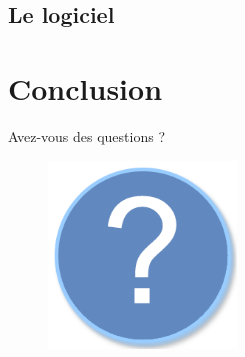 \documentclass{beamer}
\begin{document}
\subsection{Le logiciel}
\begin{frame}
\end{frame}

\section*{Conclusion} %
\begin{frame}
	
\end{frame}

\begin{frame}{Avez-vous des questions ?}
	\begin{figure}[H]
		\centering
		\includegraphics[width=5cm]{interrogation.png}
	\end{figure}
\end{frame}
\end{document}
